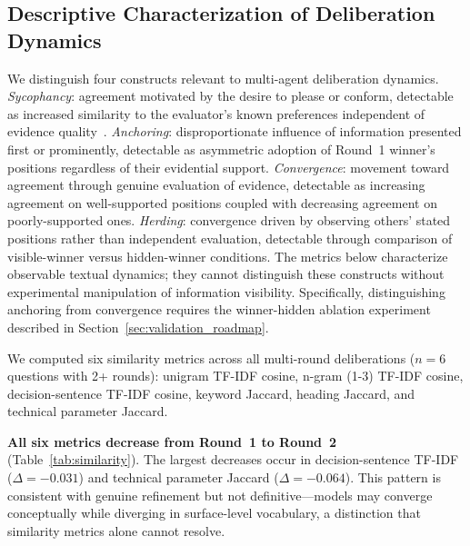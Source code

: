 \documentclass[11pt,a4paper]{article}
\begin{document}
\subsection{Descriptive Characterization of Deliberation Dynamics}
\label{sec:similarity}

We distinguish four constructs relevant to multi-agent deliberation dynamics. \textit{Sycophancy}: agreement motivated by the desire to please or conform, detectable as increased similarity to the evaluator's known preferences independent of evidence quality~\cite{sharma2024sycophancy,perez2022sycophancy}. \textit{Anchoring}: disproportionate influence of information presented first or prominently, detectable as asymmetric adoption of Round~1 winner's positions regardless of their evidential support. \textit{Convergence}: movement toward agreement through genuine evaluation of evidence, detectable as increasing agreement on well-supported positions coupled with decreasing agreement on poorly-supported ones. \textit{Herding}: convergence driven by observing others' stated positions rather than independent evaluation, detectable through comparison of visible-winner versus hidden-winner conditions. The metrics below characterize observable textual dynamics; they cannot distinguish these constructs without experimental manipulation of information visibility. Specifically, distinguishing anchoring from convergence requires the winner-hidden ablation experiment described in Section~\ref{sec:validation_roadmap}.

We computed six similarity metrics across all multi-round deliberations ($n = 6$ questions with 2+ rounds): unigram TF-IDF cosine, n-gram (1-3) TF-IDF cosine, decision-sentence TF-IDF cosine, keyword Jaccard, heading Jaccard, and technical parameter Jaccard.

\textbf{All six metrics decrease from Round~1 to Round~2} (Table~\ref{tab:similarity}). The largest decreases occur in decision-sentence TF-IDF ($\Delta = -0.031$) and technical parameter Jaccard ($\Delta = -0.064$). This pattern is consistent with genuine refinement but not definitive---models may converge conceptually while diverging in surface-level vocabulary, a distinction that similarity metrics alone cannot resolve.
\end{document}
